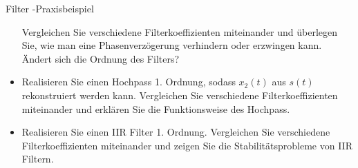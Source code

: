 \begin{exercise}{Filter -Praxisbeispiel }
\begin{itemize}
  Vergleichen Sie verschiedene Filterkoeffizienten miteinander und
  \"uberlegen Sie, wie man eine Phasenverz\"ogerung verhindern oder
  erzwingen kann. \"Andert sich die Ordnung des Filters?
\item  Realisieren Sie einen Hochpass 1. Ordnung, sodass $x_2(t)$ aus $s(t)$
  rekonstruiert werden kann.  Vergleichen Sie verschiedene Filterkoeffizienten miteinander und
 erkl\"aren Sie die Funktionsweise des Hochpass.
\item  Realisieren Sie einen IIR Filter 1. Ordnung.  Vergleichen Sie
  verschiedene Filterkoeffizienten miteinander und zeigen Sie die
  Stabilit\"atsprobleme von IIR Filtern.
\end{itemize}
\end{exercise}